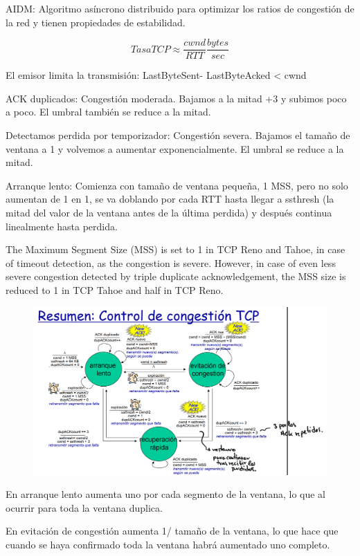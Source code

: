 \documentclass[12pt, twoside, openright]{report} %
\begin{document}
AIDM: Algoritmo asíncrono distribuido para optimizar los ratios de
congestión de la red y tienen propiedades de estabilidad.

$$Tasa TCP \approx \frac {cwnd} {RTT} \frac {bytes}{sec}$$

El emisor limita la transmisión: LastByteSent- LastByteAcked
\textless{} cwnd

ACK duplicados: Congestión moderada. Bajamos a la mitad +3 y
subimos poco a poco. El umbral también se reduce a la mitad.

Detectamos perdida por temporizador: Congestión severa. Bajamos el
tamaño de ventana a 1 y volvemos a aumentar exponencialmente. El
umbral se reduce a la mitad.

Arranque lento: Comienza con tamaño de ventana pequeña, 1 MSS, pero
no solo aumentan de 1 en 1, se va doblando por cada RTT hasta llegar
a ssthresh (la mitad del valor de la ventana antes de la última
perdida) y después continua linealmente hasta perdida.

The Maximum Segment Size (MSS) is set to 1 in TCP Reno and Tahoe, in
case of timeout detection, as the congestion is severe. However, in
case of even less severe congestion detected by triple duplicate
acknowledgement, the MSS size is reduced to 1 in TCP Tahoe and half
in TCP Reno.
\begin{figure}[H]
	{\includegraphics[scale=.15]{Untitled 19.png}}
\end{figure}
En arranque lento aumenta uno por cada segmento de la ventana, lo
que al ocurrir para toda la ventana duplica.

En evitación de congestión aumenta 1/ tamaño de la ventana, lo que
hace que cuando se haya confirmado toda la ventana habrá aumentado
uno completo.
\end{document}
